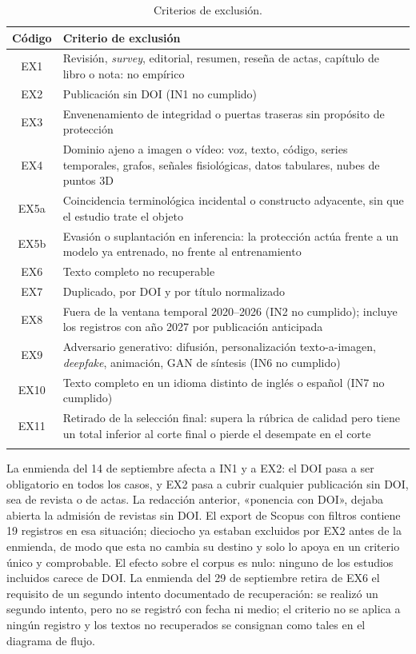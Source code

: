 \documentclass[pdflatex,sn-mathphys-num]{sn-jnl}
\theoremstyle{thmstyleone}
\theoremstyle{thmstyletwo}
\theoremstyle{thmstylethree}
\begin{document}
\begin{table}[h]
\centering
\caption{Criterios de exclusión.}\label{tab:exclusion}
\begin{tabularx}{\textwidth}{@{}cX@{}}
\toprule
Código & Criterio de exclusión \\
\midrule
EX1 & Revisión, \emph{survey}, editorial, resumen, reseña de actas, capítulo de libro o nota: no empírico \\
EX2 & Publicación sin DOI (IN1 no cumplido) \\
EX3 & Envenenamiento de integridad o puertas traseras sin propósito de protección \\
EX4 & Dominio ajeno a imagen o vídeo: voz, texto, código, series temporales, grafos, señales fisiológicas, datos tabulares, nubes de puntos 3D \\
EX5a & Coincidencia terminológica incidental o constructo adyacente, sin que el estudio trate el objeto \\
EX5b & Evasión o suplantación en inferencia: la protección actúa frente a un modelo ya entrenado, no frente al entrenamiento \\
EX6 & Texto completo no recuperable \\
EX7 & Duplicado, por DOI y por título normalizado \\
EX8 & Fuera de la ventana temporal 2020--2026 (IN2 no cumplido); incluye los registros con año 2027 por publicación anticipada \\
EX9 & Adversario generativo: difusión, personalización texto-a-imagen, \emph{deepfake}, animación, GAN de síntesis (IN6 no cumplido) \\
EX10 & Texto completo en un idioma distinto de inglés o español (IN7 no cumplido) \\
EX11 & Retirado de la selección final: supera la rúbrica de calidad pero tiene un total inferior al corte final o pierde el desempate en el corte \\
\botrule
\end{tabularx}
\end{table}

La enmienda del 14 de septiembre afecta a IN1 y a EX2: el DOI pasa a ser obligatorio en todos los casos, y EX2 pasa a cubrir cualquier publicación sin DOI, sea de revista o de actas. La redacción anterior, «ponencia con DOI», dejaba abierta la admisión de revistas sin DOI. El export de Scopus con filtros contiene 19 registros en esa situación; dieciocho ya estaban excluidos por EX2 antes de la enmienda, de modo que esta no cambia su destino y solo lo apoya en un criterio único y comprobable. El efecto sobre el corpus es nulo: ninguno de los estudios incluidos carece de DOI. La enmienda del 29 de septiembre retira de EX6 el requisito de un segundo intento documentado de recuperación: se realizó un segundo intento, pero no se registró con fecha ni medio; el criterio no se aplica a ningún registro y los textos no recuperados se consignan como tales en el diagrama de flujo.
\end{document}
